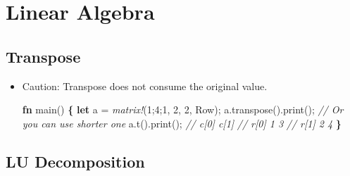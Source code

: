 \documentclass[]{book}
\newenvironment{Shaded}{\begin{snugshade}}{\end{snugshade}}
\newcommand{\CommentTok}[1]{\textcolor[rgb]{0.56,0.35,0.01}{\textit{#1}}}
\newcommand{\DecValTok}[1]{\textcolor[rgb]{0.00,0.00,0.81}{#1}}
\newcommand{\KeywordTok}[1]{\textcolor[rgb]{0.13,0.29,0.53}{\textbf{#1}}}
\newcommand{\NormalTok}[1]{#1}
\newcommand{\OperatorTok}[1]{\textcolor[rgb]{0.81,0.36,0.00}{\textbf{#1}}}
\newcommand{\PreprocessorTok}[1]{\textcolor[rgb]{0.56,0.35,0.01}{\textit{#1}}}
\begin{document}
\hypertarget{linear}{%
\chapter{Linear Algebra}\label{linear}}

\hypertarget{transpose}{%
\section{Transpose}\label{transpose}}

\begin{itemize}
\item
  Caution: Transpose does not consume the original value.

\begin{Shaded}
\begin{Highlighting}[]
\KeywordTok{fn}\NormalTok{ main() }\OperatorTok{\{}
    \KeywordTok{let}\NormalTok{ a = }\PreprocessorTok{matrix!}\NormalTok{(}\DecValTok{1}\NormalTok{;}\DecValTok{4}\NormalTok{;}\DecValTok{1}\NormalTok{, }\DecValTok{2}\NormalTok{, }\DecValTok{2}\NormalTok{, Row);}
\NormalTok{    a.transpose().print();}
    \CommentTok{// Or you can use shorter one}
\NormalTok{    a.t().print();}
    \CommentTok{//      c[0] c[1]}
    \CommentTok{// r[0]    1    3}
    \CommentTok{// r[1]    2    4}
\OperatorTok{\}}
\end{Highlighting}
\end{Shaded}
\end{itemize}

\hypertarget{lu-decomposition}{%
\section{LU Decomposition}\label{lu-decomposition}}
\end{document}
